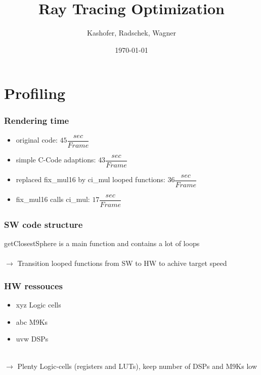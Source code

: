 \documentclass{beamer}
\title{Ray Tracing Optimization}
\author{Kashofer, Radschek, Wagner}
\date{\today}
\begin{document}
\maketitle
\frame{\tableofcontents[currentsection]}
 
\section{Profiling}
\begin{frame} %
	\frametitle{Rendering time} %
  	\begin{itemize}
		\item original code: $45 \dfrac{sec}{Frame}$
		\item simple C-Code adaptions: $43 \dfrac{sec}{Frame}$
		\item replaced fix\_mul16 by ci\_mul looped functions: $36 \dfrac{sec}{Frame}$
		\item fix\_mul16 calls ci\_mul: $17 \dfrac{sec}{Frame}$
	\end{itemize}

\end{frame}

\begin{frame} %
	\frametitle{SW code structure} %
	getClosestSphere is a main function and contains a lot of loops\\
	$\quad$\\
	$\rightarrow$ Transition looped functions from SW to HW to achive target speed
\end{frame}

\begin{frame} %
	\frametitle{HW ressouces} %
	\begin{itemize}
		\item xyz Logic cells
		\item abc M9Ks
		\item uvw DSPs
	\end{itemize}
	$\quad$\\
	$\rightarrow$ Plenty Logic-cells (registers and LUTs), keep number of DSPs and M9Ks low
\end{frame}
\end{document}
